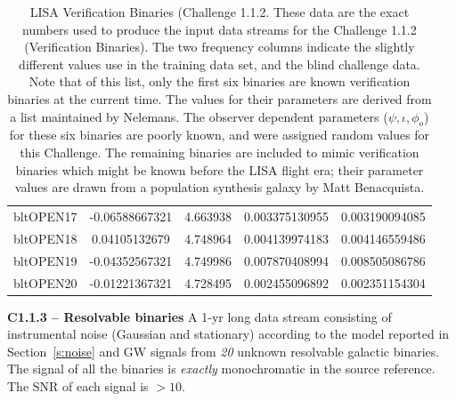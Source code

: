 \documentclass[11pt]{report}
\begin{document}
\begin{description}
\begin{center}
\begin{table}
\begin{tabular}{|l|c|c|c|c|}
bltOPEN17       & -0.06588667321        & 4.663938      & 0.003375130955        &       0.003190094085\\
bltOPEN18       & 0.04105132679         & 4.748964      & 0.004139974183        &       0.004146559486\\
bltOPEN19       & -0.04352567321        & 4.749986      & 0.007870408994        &       0.008505086786\\
bltOPEN20       & -0.01221367321        & 4.728495      & 0.002455096892        &       0.002351154304\\
\hline
\end{tabular}
    \caption{LISA Verification Binaries (Challenge 1.1.2.  
    These data are the exact numbers
    used to produce the input data streams for the Challenge 1.1.2
    (Verification Binaries).  The two frequency columns indicate the 
    slightly different values use in the training data set, and the blind 
    challenge data.  Note that of this list, only the first six
    binaries are known verification binaries at the current time.  The
    values for their parameters are derived from a list maintained by
    Nelemans\cite{NelemansWiki}.  The observer dependent parameters
    ($\psi, \iota, \phi_{o}$) for these six binaries are poorly known, and
    were assigned random values for this Challenge.
     The remaining binaries are included to mimic
    verification binaries which might be known before the LISA flight era;
    their parameter values are drawn from a population synthesis galaxy by
    Matt Benacquista.}
\label{tbl.LISAbinaries1.1.2}
\end{table}
\end{center}

\item {\bf C1.1.3 -- Resolvable binaries} A 1-yr long data stream consisting of instrumental noise (Gaussian and stationary) according to the model reported in Section~\ref{s:noise} and GW signals from {\em 20} unknown resolvable galactic binaries. The signal of all the binaries is {\em exactly} monochromatic in the source reference. The SNR of each signal is $> 10$.


\end{description}
\end{document}
